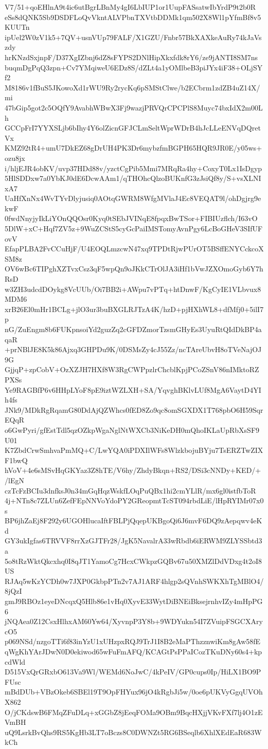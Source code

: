 V7/51+qoEHlnA9t4ic6utBgrLBnMy4gI6LbIUP1or1UupFASsatwIbYrdP9t2b0R
eSs8dQNK5Sb9DSDFLoQvVkntALVPbnTXVtbDDMk1qm502X8Wl1pYfmBf8v5KUUTn
ipUel2W0zV1k5+7QV+usnVUp79FALF/X1GZU/Fnbr57BkXAXkeAuRy74kJaVszdy
hrKNzdSxjnpF/D37XgIZbnj6dZ8sFYPS2DNlHipXkxfdk8rY6/ze9jANTI8SM7ns
buqmDgPqQ3zpn+Cv7YMqiweU6EDz8S/dZLt4a1yOMlbeB3piJYx4iF38+OLjSYf2
M8186v1fBuS5JKowoXd1rWU9Ry2rycKq6pSMStClwe/b2ECbrm1zdZB4uZ14X/mi
47bGip5got2c5OQfY9AvabhWBwX3Fj9wazjPRVQrCPCPlS8Muyc74bxIdX2m00Lh
GCCpFrI7YYXSLjb6bIhy4Y6olZicnGFJCLmSeltWprWDrB4hJcLLeENVqDQretVx
KMZ92tR4+umU7DkEZ68gDrUH4PK3Dr6mybzfmBGPH65HQR9JR0E/y05ws+ozu8jx
i/hljEJR4obKV/uvp37HDd88v/yzctCgPib5Mmi7MRqRa4hy+CoxyT0Lx1IsDgyp
5HlSDDxw7a0YbKJ0dE6DcwAAm1/qTHOhcQlzoBUKnfG3zJsiQf8y/S+vsXLNIxA7
UaHfXnNx4WvTYvDlyjusiq0AOtqGWRM8WfgMVlaJ4Ec8VEQAT9l/ohDgjrg9ekwF
0fwdNnyjyIkLiYOnQQOsr0Kyq0tSEbJVINqE8fpqxBwTSor+FIBIUzflch/I63vO
5DlW+xC+Hqf7ZV5z+9WuZCStS5cyGcPaiIMSTomyAvnPgy6LcBoGHeV3SIfUFovV
EfapPLBA2FvCCuHjF/U4EOQLmzcwN47xq9TPDtRjwPUrOT5BSffENYCckcoXSM8z
OV6wBc6TIPghXZTvxCsz3qF5wpQn9oJKkCTrOlJA3iHf1bVwJZXOmoGyb6Y7hRsD
w3ZH3udcdDOykg8VcUUb/Oi7BB2i+AWpu7vPTq+htDnwF/KgCyIE1VLbvux8MDM6
xrB26El0mHr1BCLg+jlO3ur3buBXGLRJTzA4K/hzD+pjHXhWL8+dfMfj0+5ilI7p
nG/ZuEngm8b6FUKpnsoiYd2guzZq2cGFDZmorTzsmGHyEs3UyuRtQIdDkBP4aqaR
+prNBlJE8K5k86Ajxq3GHPDu9K/0DSMsZy4cJ55Zz/ncTAreUbvH8oTVeNajOJ9G
GjjqP+zpCobV+OzXZJH7HXf8W3RgCWPpzlrChcblKpjPCoZSnV86nIMktoRZPXSs
Ye9RAGBfP6v6HHpLYoF8pE9iztWZLXH+SA/YqvghBKlvLUf8MgA6VaytD4YIh4fs
JNk9/MDkRgRqamG80DdAjQZWhcs0fED8Zo9qc8omSGXDX1T768pbO6H59SqrEQqR
o6GwPyri/gfEstTdl5qzOZkpWgaNglNtWXCb3NiKeDH0mQhoIKLaUpRbXsSF9U01
K7ZbdCrwSmhvaPmMQ+C/LwYQA0iPDXIlWFs8WlzkbojuBYju7TsERZTwZIXF1bwQ
hVoV+4e6sMSvHqGKYaz3Z8hTE/V6hy/ZhdyBkqn+RS2/DSi3cNNDy+KED/+/lEgN
czTcFzBCIu3dnfksJ0n34mGqHqzWskfLOqPuQBx1hi2cmYLlR/mx6gl0istfbToR
4j+NTn8c7ZLUn6ZefFEpNNVoYdoPY2GReopmtTcST094rbdLiE/lHpRYIMr07x0s
BP6jhZaEj8F292y6UGOHlucaIftFBLPjQqepUKBgoQi6J6mvF6DQ9zAepqwv4eKd
GY3ukIgfas6TRVVF8rrXzGJTFr28/JgK5NavalrA33wRbdb6iERWM9ZLYSSbtd3a
5o8tRzWktQkcxhq0I8qJT1YamoCg7HcxCWkpzGQBv67u50XMZlDdVDxg4t2oI8US
RJAq5wKzYCDh0w7JXP0GkbpPTn2v7AJ1ARF4hlgp2sQVnhSWKXhTgMBlO4/8jQzI
gmJ9RBOz1eyeDNcqxQ5Hlb86e1vHq0XyvE33WytDiBNEiBksejrnhvIZy4mHpPG6
jNQAea0Z12CsxHlhxAM60Yw64/XyvnpP3Y8b+9WDYukn54I7ZVuipFSGCXArycO5
p069NSd/nzgoTTi6f83inYzU1xUHzpxRQJ9TrJ1I8B2eMaPThzznwiKm8gAw58fE
qWgKhYArJDwN0D0ekiwod65wFuFmAFQ/KCAGtPsPPaICozTKuDNy60s4+kpcdWld
D515VxQrGRxbO613Va9Wl/WEMd6NoJwC/4kPeIV/GP0cups0Ip/HiLX1BO9PFUsc
mBdDUb+VBzOkeb6SBEl19T9OpFHYux96jO4kRgbJi5w/0oe6pUKVyGgqUVOhX862
O/jCKdswB6FMqZFuDLq+xGGbZ8jEeqFOMa9OBm9BqcHXjjVKvFXf7lj4O1zEVmBH
uQ9LsrkBvQhs9RS5KgHb3LT7oBczs8C0DWNZt5RG6BSeqlb6XhlXEdEaR683WkCh

